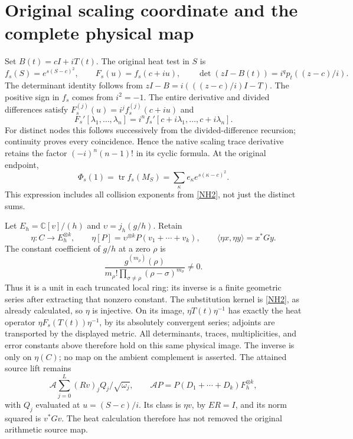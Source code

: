 \documentclass[11pt]{article}
\newcommand{\C}{\mathbb C}\newcommand{\R}{\mathbb R}
\newcommand{\tr}{\operatorname{tr}}\newcommand{\dd}{\dagger_G}
\begin{document}
\section{Original scaling coordinate and the complete physical map}

Set \(B(t)=cI+iT(t)\). The original heat test in \(S\) is
\begin{equation}\tag{NH24}\label{NH24}
f_s(S)=e^{s(S-c)^2},\qquad
F_s(u)=f_s(c+iu),\qquad
\det(zI-B(t))=i^q p_t((z-c)/i).
\end{equation}
The determinant identity follows from
\(zI-B=i(((z-c)/i)I-T)\).
The positive sign in \(f_s\) comes from \(i^2=-1\).
The entire derivative and divided differences satisfy
\(F_s^{(j)}(u)=i^j f_s^{(j)}(c+iu)\) and
\[
F_s'[\lambda_1,\ldots,\lambda_n]
=i^n f_s'[c+i\lambda_1,\ldots,c+i\lambda_n].
\]
For distinct nodes this follows successively from the
divided-difference recursion; continuity proves every
coincidence. Hence the native scaling trace derivative
retains the factor \((-i)^n(n-1)!\) in its cyclic formula.
At the original endpoint,
\begin{equation}\tag{NH25}\label{NH25}
\Phi_s(1)=\tr f_s(M_S)
=\sum_\kappa e_\kappa e^{s(\kappa-c)^2}.
\end{equation}
This expression includes all collision exponents from
\eqref{NH2}, not just the distinct sums.

Let \(E_h=\C[v]/(h)\) and
\(\upsilon=j_h(g/h)\). Retain
\begin{equation}\tag{NH26}\label{NH26}
\eta:C\longrightarrow E_h^{\otimes k},\qquad
\eta[P]=\upsilon^{\otimes k}P(v_1+\cdots+v_k),\qquad
\langle\eta x,\eta y\rangle=x^*Gy.
\end{equation}
The constant coefficient of \(g/h\) at a zero \(\rho\) is
\[
\frac{g^{(m_\rho)}(\rho)}
 {m_\rho!\prod_{\sigma\ne\rho}(\rho-\sigma)^{m_\sigma}}\ne0 .
\]
Thus it is a unit in each truncated local ring: its
inverse is a finite geometric series after extracting
that nonzero constant. The substitution kernel is
\eqref{NH2}, as already calculated, so \(\eta\) is injective.
On its image, \(\eta T(t)\eta^{-1}\) has exactly the
heat operator \(\eta F_s(T(t))\eta^{-1}\), by its
absolutely convergent series; adjoints are transported
by the displayed metric. All determinants, traces,
multiplicities, and error constants above therefore
hold on this same physical image. The inverse is only
on \(\eta(C)\); no map on the ambient complement is asserted.
The attained source lift remains
\[
\mathcal A\sum_{j=0}^L(Rv)_jQ_j/\sqrt{\omega_j},
\qquad
\mathcal A P=P(D_1+\cdots+D_k)F_h^{\otimes k},
\]
with \(Q_j\) evaluated at \(u=(S-c)/i\).
Its class is \(\eta v\), by \(ER=I\), and its norm
squared is \(v^*Gv\). The heat calculation therefore
has not removed the original arithmetic source map.
\end{document}
